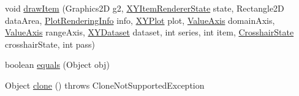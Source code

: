 \begin{DoxyCompactItemize}
void \mbox{\hyperlink{classorg_1_1jfree_1_1chart_1_1renderer_1_1xy_1_1_standard_x_y_item_renderer_af4178cc4c14c973aac8e423baa757293}{draw\+Item}} (Graphics2D g2, \mbox{\hyperlink{classorg_1_1jfree_1_1chart_1_1renderer_1_1xy_1_1_x_y_item_renderer_state}{X\+Y\+Item\+Renderer\+State}} state, Rectangle2D data\+Area, \mbox{\hyperlink{classorg_1_1jfree_1_1chart_1_1plot_1_1_plot_rendering_info}{Plot\+Rendering\+Info}} info, \mbox{\hyperlink{classorg_1_1jfree_1_1chart_1_1plot_1_1_x_y_plot}{X\+Y\+Plot}} plot, \mbox{\hyperlink{classorg_1_1jfree_1_1chart_1_1axis_1_1_value_axis}{Value\+Axis}} domain\+Axis, \mbox{\hyperlink{classorg_1_1jfree_1_1chart_1_1axis_1_1_value_axis}{Value\+Axis}} range\+Axis, \mbox{\hyperlink{interfaceorg_1_1jfree_1_1data_1_1xy_1_1_x_y_dataset}{X\+Y\+Dataset}} dataset, int series, int item, \mbox{\hyperlink{classorg_1_1jfree_1_1chart_1_1plot_1_1_crosshair_state}{Crosshair\+State}} crosshair\+State, int pass)
\item 
boolean \mbox{\hyperlink{classorg_1_1jfree_1_1chart_1_1renderer_1_1xy_1_1_standard_x_y_item_renderer_a9b9590f106e42963b5cb7b696a551d6d}{equals}} (Object obj)
\item 
Object \mbox{\hyperlink{classorg_1_1jfree_1_1chart_1_1renderer_1_1xy_1_1_standard_x_y_item_renderer_a65ecf32c9ebe4bbc0eac341854c103ed}{clone}} ()  throws Clone\+Not\+Supported\+Exception 
\end{DoxyCompactItemize}
